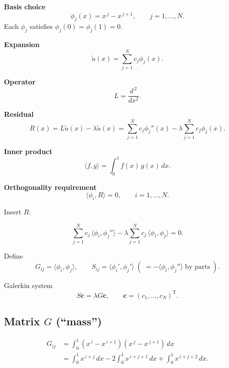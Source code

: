\documentclass{article}
\begin{document}
\textbf{Basis choice}  
\[
\phi_j(x)=x^{\,j}-x^{\,j+1},\qquad j=1,\dots ,N .
\]
Each $\phi_j$ satisfies $\phi_j(0)=\phi_j(1)=0$.

\textbf{Expansion}  
\[
\tilde u(x)=\sum_{j=1}^{N}c_j\phi_j(x).
\]


\textbf{Operator}  
\[
L=\dfrac{d^{\,2}}{dx^{2}}.
\]

\textbf{Residual}  
\[
R(x)=L\tilde u(x)-\lambda \tilde u(x)=\sum_{j=1}^{N}c_j\phi_j''(x)-\lambda\sum_{j=1}^{N}c_j\phi_j(x).
\]


\textbf{Inner product}  
\[
\langle f,g\rangle=\int_{0}^{1}f(x)\,g(x)\,dx .
\]

\textbf{Orthogonality requirement}  
\[
\langle\phi_i,R\rangle=0,\qquad i=1,\dots ,N .
\]

Insert $R$:

\[
\sum_{j=1}^{N}c_j\,\langle\phi_i,\phi_j''\rangle
-
\lambda
\sum_{j=1}^{N}c_j\,\langle\phi_i,\phi_j\rangle=0.
\]


Define
\[
G_{ij}=\langle\phi_i,\phi_j\rangle,
\qquad
S_{ij}=\langle\phi_i',\phi_j'\rangle
\;(\;= -\langle\phi_i,\phi_j''\rangle\;\text{by parts}\;).
\]

Galerkin system  
\[
S\mathbf c=\lambda G\mathbf c,\qquad
\mathbf c=(c_1,\dots ,c_N)^{\mathrm T}.
\]


\subsection*{Matrix $G$ (``mass'')}

\begin{align*}
G_{ij}
&=\int_{0}^{1}(x^{\,i}-x^{\,i+1})(x^{\,j}-x^{\,j+1})\,dx\\[4pt]
&=\int_{0}^{1}x^{\,i+j}\,dx
-2\int_{0}^{1}x^{\,i+j+1}\,dx
+\int_{0}^{1}x^{\,i+j+2}\,dx.
\end{align*}
\end{document}
